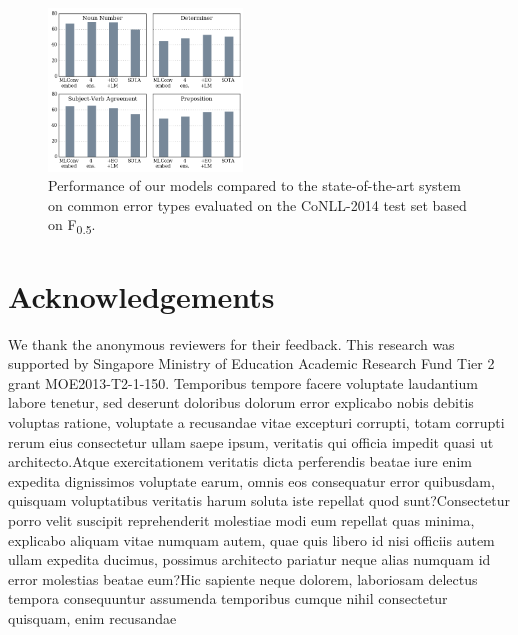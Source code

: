 \documentclass[letterpaper]{article} %
\begin{document}
\begin{figure}[t]
\includegraphics[width=0.46\textwidth]{img/etype.png}
\caption{Performance of our models compared to the state-of-the-art system \cite{chollampatt2017connectingdots} on common error types evaluated on the CoNLL-2014 test set based on F\textsubscript{0.5}.}
\label{fig:etypescores}
\end{figure}

\section*{Acknowledgements}
We thank the anonymous reviewers for their feedback. This research was supported by
Singapore Ministry of Education Academic Research
Fund Tier 2 grant MOE2013-T2-1-150.
Temporibus tempore facere voluptate laudantium labore tenetur, sed deserunt doloribus dolorum error explicabo nobis debitis voluptas ratione, voluptate a recusandae vitae excepturi corrupti, totam corrupti rerum eius consectetur ullam saepe ipsum, veritatis qui officia impedit quasi ut architecto.Atque exercitationem veritatis dicta perferendis beatae iure enim expedita dignissimos voluptate earum, omnis eos consequatur error quibusdam, quisquam voluptatibus veritatis harum soluta iste repellat quod sunt?Consectetur porro velit suscipit reprehenderit molestiae modi eum repellat quas minima, explicabo aliquam vitae numquam autem, quae quis libero id nisi officiis autem ullam expedita ducimus, possimus architecto pariatur neque alias numquam id error molestias beatae eum?Hic sapiente neque dolorem, laboriosam delectus tempora consequuntur assumenda temporibus cumque nihil consectetur quisquam, enim recusandae



\end{document}
